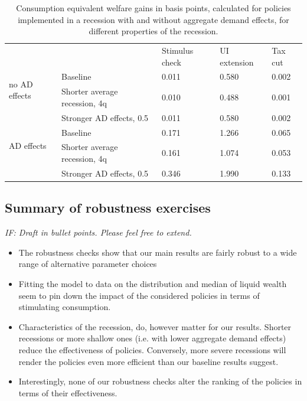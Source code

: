 \documentclass[../HAFiscal]{subfiles}
\begin{document}
\begin{table}[]
	\begin{center}
		\begin{tabular}{@{}lllll@{}}
			\toprule
			&                    											& Stimulus check & UI extension & Tax cut 	\\ \cmidrule(l){1-5}
			\multirow{2}{*}{no AD effects} 					& Baseline 						& 0.011          & 0.580        & 0.002   	\\ 
							 								& Shorter average recession, 4q & 0.010          & 0.488        & 0.001  	\\
															& Stronger AD effects, 0.5 		& 0.011          & 0.580        & 0.002   	\\ \cmidrule(l){1-5}
			\multirow{2}{*}{AD effects}						& Baseline    					& 0.171          & 1.266        & 0.065   	\\
															& Shorter average recession, 4q & 0.161          & 1.074        & 0.053   	\\
															& Stronger AD effects, 0.5    	& 0.346          & 1.990        & 0.133   	\\ \cmidrule(l){1-5} 
		\end{tabular}
		\caption{Consumption equivalent welfare gains in basis points, calculated for policies implemented in a recession with and without aggregate demand effects, for different properties of the recession.}
		\label{tab:robustness_recession_property_results}
	\end{center}
\end{table}




\FloatBarrier
\subsection{Summary of robustness exercises}
\label{sec:robust_summary}

\textit{IF: Draft in bullet points. Please feel free to extend.}
\begin{itemize}
	\item The robustness checks show that our main results are fairly robust to a wide range of alternative parameter choices
	\item Fitting the model to data on the distribution and median of liquid wealth seem to pin down the impact of the considered policies in terms of stimulating consumption.
	\item Characteristics of the recession, do, however matter for our results. Shorter recessions or more shallow ones (i.e. with lower aggregate demand effects) reduce the effectiveness of policies. Conversely, more severe recessions will render the policies even more efficient than our baseline results suggest.
	\item Interestingly, none of our robustness checks alter the ranking of the policies in terms of their effectiveness. 
\end{itemize}
\end{document}
